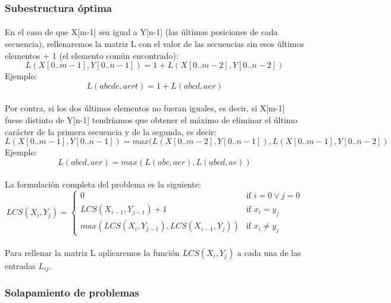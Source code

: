 \documentclass{article}
\begin{document}
		\subsubsection{Subestructura óptima}

			\paragraph{}
			En el caso de que X[m-1] sea igual a Y[n-1] (las últimas posiciones de cada secuencia), rellenaremos la matriz L con el valor de las secuencias sin esos últimos elementos + 1 (el elemento común encontrado):
			\[
			L(X[0..m-1], Y[0..n-1]) = 1 + L(X[0..m-2], Y[0..n-2])
			\]
			\newline{}
			Ejemplo:
			\[
			L(abcde, aert) = 1 + L(abcd, aer)
			\]

			\paragraph{}
			Por contra, si los dos últimos elementos no fueran iguales, es decir, si X[m-1] fuese distinto de Y[n-1] tendríamos que obtener el máximo de eliminar el último carácter de la primera secuencia y de la segunda, es decir:
			\[
			L(X[0..m-1], Y[0..n-1]) = max(L(X[0..m-2], Y[0..n-1]), L(X[0..m-1], Y[0..n-2])
			\]
			\newline{}
			Ejemplo:
			\[
			L(abcd, aer) = max( L(abc, aer), L(abcd, ae) )
			\]

			\paragraph{}
			La formulación completa del problema es la siguiente:
			\[
   			 LCS( X_{i}, Y_{j} ) =
				\begin{cases}
				    	0									& \text{if } i = 0 \vee	 j = 0\\
    					LCS( X_{i-1}, Y_{j-1}) + 1					& \text{if } x_{i} = y_{j}\\
    					max(LCS( X_{i}, Y_{j-1}), LCS( X_{i-1}, Y_{j}))	& \text{if } x_{i} \not = y_{j}
				\end{cases}
			\]

			\paragraph{}
			Para rellenar la matriz L aplicaremos la función $LCS( X_{i}, Y_{j} )$ a cada una de las entradas $L_{ij}$.

		\subsubsection{Solapamiento de problemas}
\end{document}
